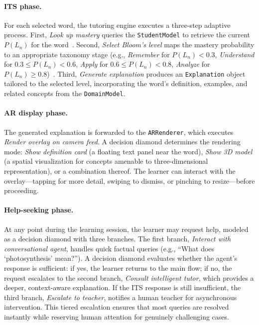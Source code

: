 \paragraph{ITS phase.}
For each selected word, the tutoring engine executes a three-step adaptive process. First, \emph{Look up mastery} queries the \texttt{StudentModel} to retrieve the current $P(L_n)$ for the word~\cite{Corbett1994}. Second, \emph{Select Bloom's level} maps the mastery probability to an appropriate taxonomy stage (e.g., \emph{Remember} for $P(L_n) < 0.3$, \emph{Understand} for $0.3 \leq P(L_n) < 0.6$, \emph{Apply} for $0.6 \leq P(L_n) < 0.8$, \emph{Analyze} for $P(L_n) \geq 0.8$)~\cite{Bloom1956,Krathwohl2002}. Third, \emph{Generate explanation} produces an \texttt{Explanation} object tailored to the selected level, incorporating the word's definition, examples, and related concepts from the \texttt{DomainModel}.

\paragraph{AR display phase.}
The generated explanation is forwarded to the \texttt{ARRenderer}, which executes \emph{Render overlay on camera feed}. A decision diamond determines the rendering mode: \emph{Show definition card} (a floating text panel near the word), \emph{Show 3D model} (a spatial visualization for concepts amenable to three-dimensional representation), or a combination thereof. The learner can interact with the overlay---tapping for more detail, swiping to dismiss, or pinching to resize---before proceeding.

\paragraph{Help-seeking phase.}
At any point during the learning session, the learner may request help, modeled as a decision diamond with three branches. The first branch, \emph{Interact with conversational agent}, handles quick factual queries (e.g., ``What does `photosynthesis' mean?''). A decision diamond evaluates whether the agent's response is sufficient: if yes, the learner returns to the main flow; if no, the request escalates to the second branch, \emph{Consult intelligent tutor}, which provides a deeper, context-aware explanation. If the ITS response is still insufficient, the third branch, \emph{Escalate to teacher}, notifies a human teacher for asynchronous intervention. This tiered escalation ensures that most queries are resolved instantly while reserving human attention for genuinely challenging cases.

